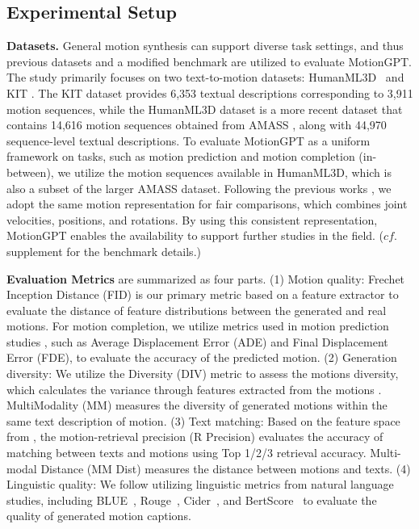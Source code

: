 \subsection{Experimental Setup}
\label{sec:comp:metric}
\textbf{Datasets.} General motion synthesis can support diverse task settings, and thus previous datasets and a modified benchmark are utilized to evaluate MotionGPT.
%
The study primarily focuses on two text-to-motion datasets: HumanML3D~\cite{Guo_2022_CVPR_humanml3d} and KIT \cite{Plappert2016kit}. 
%
The KIT dataset provides 6,353 textual descriptions corresponding to 3,911 motion sequences, while the HumanML3D dataset \cite{Guo_2022_CVPR_humanml3d} is a more recent dataset that contains 14,616 motion sequences obtained from AMASS \cite{AMASS_ICCV2019}, along with 44,970 sequence-level textual descriptions. 
%
To evaluate MotionGPT as a uniform framework on tasks, such as motion prediction and motion completion (in-between), we utilize the motion sequences available in HumanML3D, which is also a subset of the larger AMASS dataset.
%
Following the previous works \cite{Guo_2022_CVPR_humanml3d, chen2023mld, mdm2022human}, we adopt the same motion representation for fair comparisons, which combines joint velocities, positions, and rotations. 
%
By using this consistent representation, MotionGPT enables the availability to support further studies in the field.
%
($cf.$ supplement for the benchmark details.)

\textbf{Evaluation Metrics} are summarized as four parts. (1) Motion quality: 
Frechet Inception Distance (FID) is our primary metric based on a feature extractor \cite{Guo_2022_CVPR_humanml3d} to evaluate the distance of feature distributions between the generated and real motions.
%
For motion completion, we utilize metrics used in motion prediction studies \cite{yuan2020dlow, zhang2021we, ma2022multi}, such as Average Displacement Error (ADE) and Final Displacement Error (FDE), to evaluate the accuracy of the predicted motion.
%
%
(2) Generation diversity: 
We utilize the Diversity (DIV) metric to assess the motions diversity, which calculates the variance through features extracted from the motions \cite{Guo_2022_CVPR_humanml3d}. MultiModality (MM) measures the diversity of generated motions within the same text description of motion.
%
(3) Text matching: Based on the feature space from \cite{Guo_2022_CVPR_humanml3d}, the motion-retrieval precision (R Precision) evaluates the accuracy of matching between texts and motions using Top 1/2/3 retrieval accuracy. Multi-modal Distance (MM Dist) measures the distance between motions and texts.
% 
(4) Linguistic quality: We follow \cite{chuan2022tm2t} utilizing linguistic metrics from natural language studies, including BLUE~\cite{papineni2002bleu}, Rouge~\cite{lin2004rouge}, Cider~\cite{vedantam2015cider}, and BertScore~\cite{zhang2019bertscore} to evaluate the quality of generated motion captions.


